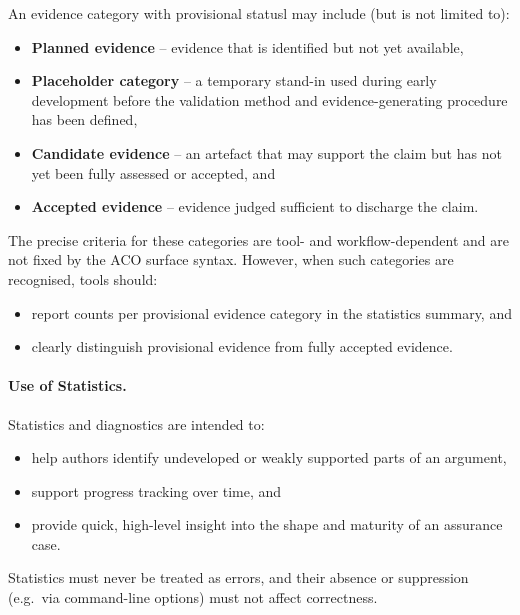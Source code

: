 \documentclass[11pt]{article}
\begin{document}
An evidence category with provisional statusl may include (but is not limited to):
\begin{itemize}[leftmargin=2em]
  \item \textbf{Planned evidence} -- evidence that is identified but not yet available,
  \item \textbf{Placeholder category} -- a temporary stand-in used during early development before the validation method and evidence-generating procedure has been defined,
  \item \textbf{Candidate evidence} -- an artefact that may support the claim but has not
        yet been fully assessed or accepted, and
  \item \textbf{Accepted evidence} -- evidence judged sufficient to discharge the claim.
\end{itemize}

The precise criteria for these categories are tool- and workflow-dependent and are
not fixed by the ACO surface syntax. However, when such categories are recognised,
tools should:
\begin{itemize}[leftmargin=2em]
  \item report counts per provisional evidence category in the statistics summary, and
  \item clearly distinguish provisional evidence from fully accepted evidence.
\end{itemize}

\paragraph{Use of Statistics.}
Statistics and diagnostics are intended to:
\begin{itemize}[leftmargin=2em]
  \item help authors identify undeveloped or weakly supported parts of an argument,
  \item support progress tracking over time, and
  \item provide quick, high-level insight into the shape and maturity of an assurance case.
\end{itemize}

Statistics must never be treated as errors, and their absence or suppression
(e.g.\ via command-line options) must not affect correctness.
\end{document}
